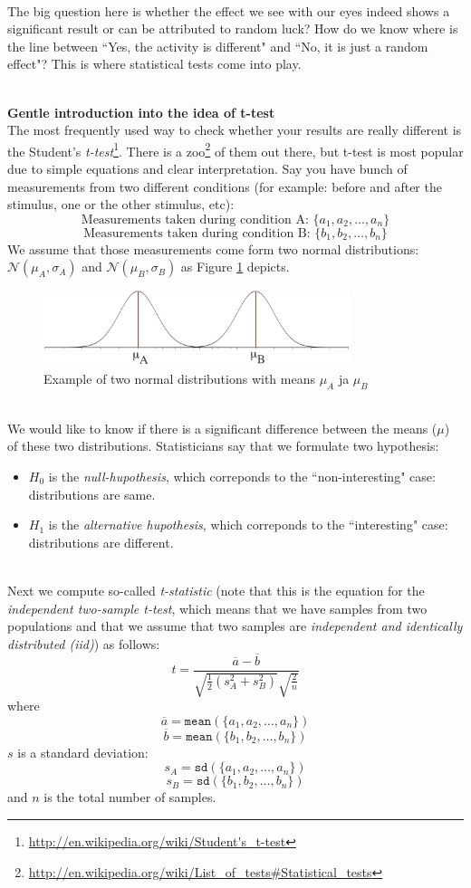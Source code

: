 \documentclass[a4paper,11pt]{article}
\begin{document}
\ \\
The big question here is whether the effect we see with our eyes indeed shows a significant result or can be attributed to random luck? How do we know where is the line between ``Yes, the activity is different" and ``No, it is just a random effect"? This is where statistical tests come into play.

\ \\
\textbf{Gentle introduction into the idea of t-test}\\
The most frequently used way to check whether your results are really different is the Student's \emph{t-test}\footnote{\url{http://en.wikipedia.org/wiki/Student's_t-test}}. There is a zoo\footnote{\url{http://en.wikipedia.org/wiki/List_of_tests\#Statistical_tests}} of them out there, but t-test is most popular due to simple equations and clear interpretation. Say you have bunch of measurements from two different conditions (for example: before and after the stimulus, one or the other stimulus, etc):
$$\text{Measurements taken during condition A: } \{a_1, a_2, \ldots, a_n\}$$
$$\text{Measurements taken during condition B: } \{b_1, b_2, \ldots, b_n\}$$
We assume that those measurements come form two normal distributions: $\mathcal{N}(\mu_A, \sigma_A)$ and $\mathcal{N}(\mu_B, \sigma_B)$ as Figure \ref{fig:twonormals} depicts.
\begin{figure}[H]
   \centering
   \includegraphics[width=0.8\textwidth]{twonormals.png} 
   \caption{Example of two normal distributions with means $\mu_A$ ja $\mu_B$}
   \label{fig:twonormals}
\end{figure}
\ \\
We would like to know if there is a significant difference between the means ($\mu$) of these two distributions. Statisticians say that we formulate two hypothesis:
\begin{itemize}
	\item $H_0$ is the \emph{null-hupothesis}, which correponds to the ``non-interesting" case: distributions are same.
	\item $H_1$ is the \emph{alternative hupothesis}, which correponds to the ``interesting" case: distributions are different.
\end{itemize}
\ \\
Next we compute so-called \emph{t-statistic} (note that this is the equation for the \emph{independent two-sample t-test}, which means that we have samples from two populations and that we assume that two samples are \emph{independent and identically distributed (iid)}) as follows:
$$t = \frac{\overline{a} - \overline{b}}{\sqrt{\frac{1}{2}(s^2_A + s^2_B)}\sqrt{\frac{2}{n}}}$$
where
$$\overline{a} = \texttt{mean}(\{a_1, a_2, \ldots, a_n\})$$
$$\overline{b} = \texttt{mean}(\{b_1, b_2, \ldots, b_n\})$$
$s$ is a standard deviation:
$$s_A = \texttt{sd}(\{a_1, a_2, \ldots, a_n\})$$
$$s_B = \texttt{sd}(\{b_1, b_2, \ldots, b_n\})$$
and $n$ is the total number of samples.
\end{document}
